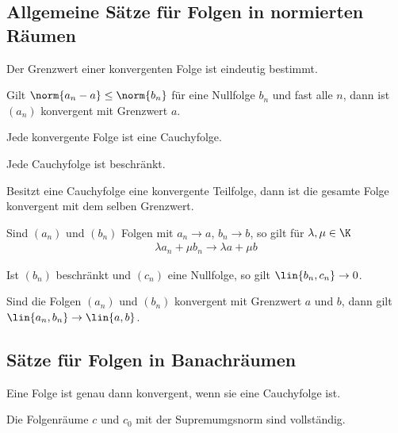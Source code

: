 \subsection{Allgemeine Sätze für Folgen in normierten Räumen}

\begin{prop}
Der Grenzwert einer konvergenten Folge ist eindeutig bestimmt.
\end{prop}
\begin{prop}
Gilt $\norm{a_n - a} \le \norm{b_n}$ für eine Nullfolge $b_n$ und fast
alle $n$, dann ist $(a_n)$ konvergent mit Grenzwert $a$.
\end{prop}
\begin{prop}
Jede konvergente Folge ist eine Cauchyfolge.
\end{prop}
\begin{prop}
Jede Cauchyfolge ist beschränkt.
\end{prop}
\begin{prop}
Besitzt eine Cauchyfolge eine konvergente Teilfolge, dann ist die gesamte
Folge konvergent mit dem selben Grenzwert.
\end{prop}
\begin{prop}
Sind $(a_n)$ und $(b_n)$ Folgen mit $a_n \to a$, $b_n \to b$, so gilt für
$\lambda,\mu\in \K$
\begin{align*}
\lambda a_n + \mu b_n \to \lambda a + \mu b
\end{align*}
\end{prop}
\begin{prop}
Ist $(b_n)$ beschränkt und $(c_n)$ eine Nullfolge, so gilt $\lin{b_n,c_n} \to
0$.
\end{prop}
\begin{prop}
Sind die Folgen $(a_n)$ und $(b_n)$ konvergent mit Grenzwert $a$ und $b$, dann
gilt $\lin{a_n,b_n} \to \lin{a,b}$.
\end{prop}

\subsection{Sätze für Folgen in Banachräumen}

\begin{prop}
Eine Folge ist genau dann konvergent, wenn sie eine Cauchyfolge ist.
\end{prop}
\begin{prop}
Die Folgenräume $c$ und $c_0$ mit der Supremumgsnorm sind vollständig.
\end{prop}

